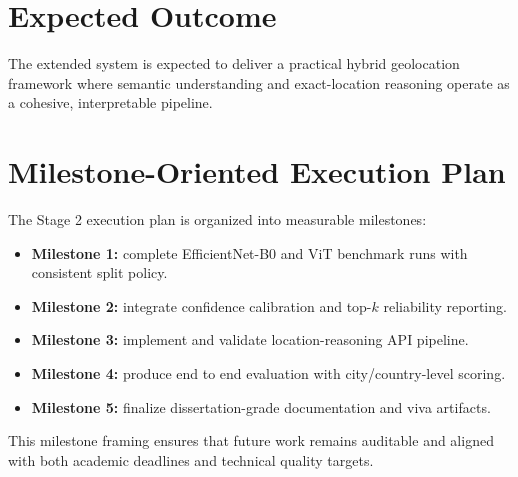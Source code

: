 \section{Expected Outcome}
The extended system is expected to deliver a practical hybrid geolocation framework where semantic understanding and exact-location reasoning operate as a cohesive, interpretable pipeline.

\section{Milestone-Oriented Execution Plan}
The Stage 2 execution plan is organized into measurable milestones:
\begin{itemize}
\item \textbf{Milestone 1:} complete EfficientNet-B0 and ViT benchmark runs with consistent split policy.
\item \textbf{Milestone 2:} integrate confidence calibration and top-$k$ reliability reporting.
\item \textbf{Milestone 3:} implement and validate location-reasoning API pipeline.
\item \textbf{Milestone 4:} produce end to end evaluation with city/country-level scoring.
\item \textbf{Milestone 5:} finalize dissertation-grade documentation and viva artifacts.
\end{itemize}

This milestone framing ensures that future work remains auditable and aligned with both academic deadlines and technical quality targets.

